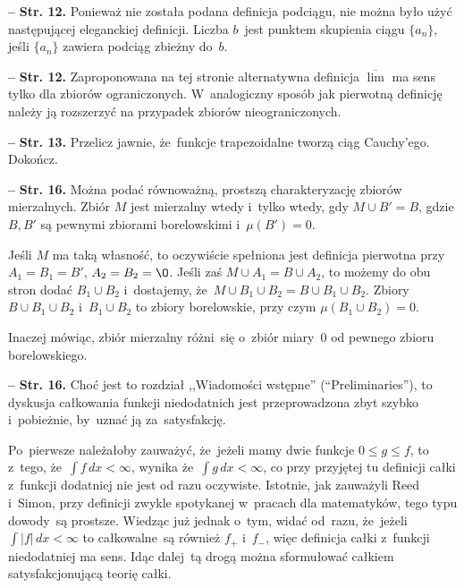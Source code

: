 \documentclass[a4paper,11pt]{article}
\newcommand{\spaceThree}{0.5em}
\newcommand{\ol}{\overline}
\newcommand{\wtw}{wtedy i~tylko wtedy}
\newcommand{\Limsup}{\ol{\lim}}
\newcommand{\Int}{\int\limits}
\newcommand{\IntCaD}[2] { \Int #1 \, d#2 } %
\providecommand{\absj}[1]{\lvert #1 \rvert}
\newcommand{\tb}{\textbf}
\newcommand{\noi}{\noindent}
\newcommand{\start}{\noi \tb{--} {}}
\newcommand{\Str}[1]{\tb{Str. #1.}}
\newcommand{\Dok}{{\color{red} Dokończ.}}
\begin{document}
\vspace{\spaceThree}


\start \Str{12} Ponieważ nie została podana definicja podciągu, nie
można było użyć następującej eleganckiej definicji. Liczba $b$~jest
punktem skupienia ciągu $\{ a_{ n } \}$, jeśli $\{ a_{ n } \}$ zawiera
podciąg zbieżny do~$b$. %

\vspace{\spaceThree}


\start \Str{12} Zaproponowana na tej stronie alternatywna definicja
$\Limsup$ ma sens tylko dla zbiorów ograniczonych. W~analogiczny
sposób jak pierwotną definicję należy ją rozszerzyć na przypadek
zbiorów nieograniczonych. %

\vspace{\spaceThree}


\start \Str{13} Przelicz jawnie, że~funkcje trapezoidalne tworzą ciąg
Cauchy'ego. \Dok

\vspace{\spaceThree}


\start \Str{16} Można podać równoważną, prostszą charakteryzację
zbiorów mierzalnych. Zbiór $M$ jest mierzalny \wtw, gdy
$M \cup B' = B$, gdzie $B, B'$ są pewnymi zbiorami borelowskimi
i~$\mu( B' ) = 0$.

Jeśli $M$ ma taką własność, to oczywiście spełniona jest definicja
pierwotna przy $A_{ 1 } = B_{ 1 } = B'$, $A_{ 2 } = B_{ 2 } = \O$.
Jeśli zaś $M \cup A_{ 1 } = B \cup A_{ 2 }$, to możemy do obu stron
dodać $B_{ 1 } \cup B_{ 2 }$ i~dostajemy,
że~$M \cup B_{ 1 } \cup B_{ 2 } = B \cup B_{ 1 } \cup B_{ 2 }$. Zbiory
$B \cup B_{ 1 } \cup B_{ 2 }$ i~$B_{ 1 } \cup B_{ 2 }$ to zbiory
borelowskie, przy czym $\mu( B_{ 1 } \cup B_{ 2 } ) = 0$.

Inaczej mówiąc, zbiór mierzalny różni~się o~zbiór miary~0 od pewnego
zbioru borelowskiego. %

\vspace{\spaceThree}


\start \Str{16} Choć jest to rozdział ,,Wiadomości wstępne''
(``Preliminaries''), to dyskusja całkowania funkcji niedodatnich jest
przeprowadzona zbyt szybko i~pobieżnie, by~uznać ją za~satysfakcję.

Po~pierwsze należałoby zauważyć, że~jeżeli mamy dwie funkcje
$0 \leq g \leq f$, to z~tego, że~$\IntCaD{ f }{ x } < \infty$, wynika
że~$\IntCaD{ g }{ x } < \infty$, co przy przyjętej tu definicji całki
z~funkcji dodatniej nie jest od razu oczywiste. Istotnie, jak
zauważyli Reed i~Simon, przy definicji zwykle spotykanej w~pracach dla
matematyków, tego typu dowody~są prostsze. Wiedząc już jednak o~tym,
widać od~razu, że~jeżeli $\IntCaD{ \absj{ f } }{ x } < \infty$ to
całkowalne~są również $f_{ + }$ i~$f_{ - }$, więc definicja całki
z~funkcji niedodatniej ma sens. Idąc dalej~tą drogą można sformułować
całkiem satysfakcjonującą teorię całki.
\end{document}
